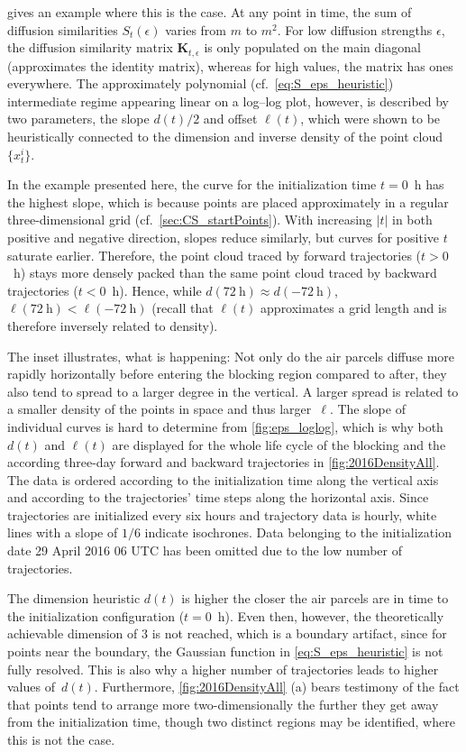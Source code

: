  gives an example where this is the case. At any point in time, the sum of diffusion similarities $S_t(\epsilon)$ varies from $m$ to $m^2$. For low diffusion strengths $\epsilon$, the diffusion similarity matrix $\mathbf{K}_{t, \epsilon}$ is only populated on the main diagonal (approximates the identity matrix), whereas for high values, the matrix has ones everywhere. The approximately polynomial (cf.~\cref{eq:S_eps_heuristic}) intermediate regime appearing linear on a log--log plot, however, is described by two parameters, the slope $d(t)/2$ and offset $\ell(t)$, which were shown to be heuristically connected to the dimension and inverse density of the point cloud $\{x_t^i\}$.

In the example presented here, the curve for the initialization time $t=0$~h has the highest slope, which is because points are placed approximately in a regular three-dimensional grid (cf.~\cref{sec:CS_startPoints}). With increasing $|t|$ in both positive and negative direction, slopes reduce similarly, but curves for positive $t$ saturate earlier. Therefore, the point cloud traced by forward trajectories ($t>0$~h) stays more densely packed than the same point cloud traced by backward trajectories ($t<0$~h). Hence, while $d(72~\mathrm{h}) \approx d(-72~\mathrm{h})$, $\ell(72~\mathrm{h}) < \ell(-72~\mathrm{h})$ (recall that $\ell(t)$ approximates a grid length and is therefore inversely related to density).

The inset illustrates, what is happening: Not only do the air parcels diffuse more rapidly horizontally before entering the blocking region compared to after, they also tend to spread to a larger degree in the vertical. A larger spread is related to a smaller density of the points in space and thus larger~$\ell$. The slope of individual curves is hard to determine from \cref{fig:eps_loglog}, which is why both $d(t)$ and $\ell(t)$ are displayed for the whole life cycle of the blocking and the according three-day forward and backward trajectories in \cref{fig:2016DensityAll}. The data is ordered according to the initialization time along the vertical axis and according to the trajectories' time steps along the horizontal axis. Since trajectories are initialized every six hours and trajectory data is hourly, white lines with a slope of $1/6$ indicate isochrones. Data belonging to the initialization date 29 April 2016 06 UTC has been omitted due to the low number of trajectories.

The dimension heuristic $d(t)$ is higher the closer the air parcels are in time to the initialization configuration ($t=0$~h). Even then, however, the theoretically achievable dimension of $3$ is not reached, which is a boundary artifact, since for points near the boundary, the Gaussian function in \cref{eq:S_eps_heuristic} is not fully resolved. This is also why a higher number of trajectories leads to higher values of~$d(t)$. Furthermore, \cref{fig:2016DensityAll} (a) bears testimony of the fact that points tend to arrange more two-dimensionally the further they get away from the initialization time, though two distinct regions may be identified, where this is not the case.

